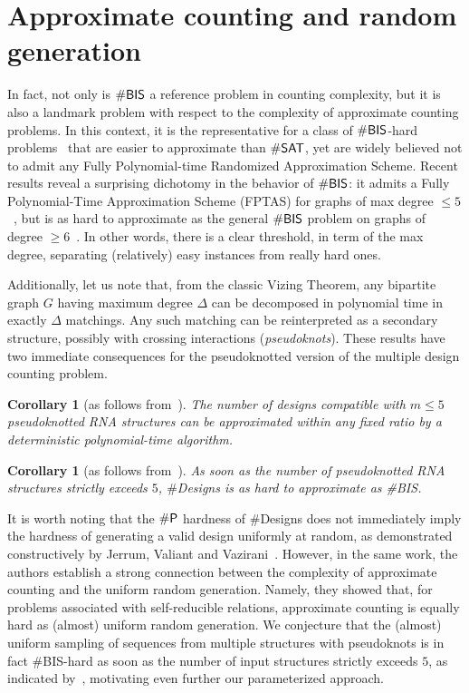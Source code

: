 \documentclass[10pt]{article}
\newtheorem{corollary}[theorem]{Corollary}
\newcommand{\Def}[1]{\emph{#1}}
\newcommand{\NumDesign}{\ensuremath{\#}{\sf Designs}\xspace}
\newcommand{\citep}[1]{\cite{#1}}
\newcommand{\citet}[1]{\cite{#1}}
\begin{document}
\section{Approximate counting and random generation}
\label{appsec:approximate-counting}

In fact, not only is $\#{\sf BIS}$ a reference problem in counting complexity, but it is also a landmark problem with respect to the complexity of approximate counting problems. In this context, it is the representative for a class of $\#{\sf BIS}$-hard problems~\citep{Bulatov2013} that are easier to approximate than $\# {\sf SAT}$, yet are widely believed not to admit any Fully Polynomial-time Randomized Approximation Scheme. Recent results reveal a surprising dichotomy in the behavior of $\#{\sf BIS}$: it admits a Fully Polynomial-Time Approximation Scheme (FPTAS) for graphs of max degree $\le 5$~\citep{Weitz2006}, but is as hard to approximate as the general $\#{\sf BIS}$ problem on graphs of degree $\ge 6$~\citep{Cai2016}. In other words, there is a clear threshold, in term of the max degree, separating (relatively) easy instances from really hard ones.

Additionally, let us note that, from the classic Vizing Theorem, any bipartite graph $G$ having maximum degree $\Delta$ can be decomposed in polynomial time in exactly $\Delta$ matchings. Any such matching can be reinterpreted as a secondary structure, possibly with crossing interactions (\Def{pseudoknots}). These results have two immediate consequences for the pseudoknotted version of the multiple design counting problem.
\begin{corollary}[as follows from~\citep{Weitz2006}]The number of designs compatible with $m\le 5$ pseudoknotted RNA structures can be approximated within any fixed ratio by a deterministic polynomial-time algorithm.
\end{corollary}
\begin{corollary}[as follows from~\citep{Cai2016}]
  As soon as the number of pseudoknotted RNA structures strictly exceeds $5$, \NumDesign is as hard to approximate as {\#{\sf BIS}}.
\end{corollary}

It is worth noting that the $\#{\sf P}$ hardness of \NumDesign does not immediately imply the hardness of generating a valid design uniformly at random, as demonstrated constructively by Jerrum, Valiant and Vazirani~\citep{Jerrum1986}. However, in the same work, the authors establish a strong connection between the complexity of approximate counting and the uniform random generation. Namely, they showed that, for problems associated with self-reducible relations, approximate counting is equally hard as (almost) uniform random generation. We conjecture that the (almost) uniform sampling of sequences from multiple structures with pseudoknots is in fact \#{\sf BIS}-hard as soon as the number of input structures strictly exceeds $5$, as indicated by~\citet{Goldberg2004}, motivating even further our parameterized approach.
\end{document}
